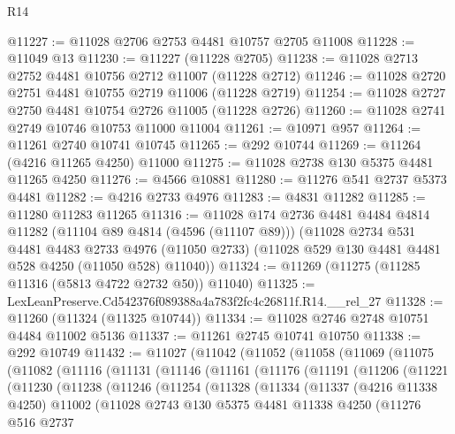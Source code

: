 \begin{lexlean}{R14}
\begin{coremodule}
@11227 := @11028 @2706 @2753 @4481 @10757 @2705 @11008
@11228 := @11049 @13
@11230 := @11227 (@11228 @2705)
@11238 := @11028 @2713 @2752 @4481 @10756 @2712 @11007 (@11228 @2712)
@11246 := @11028 @2720 @2751 @4481 @10755 @2719 @11006 (@11228 @2719)
@11254 := @11028 @2727 @2750 @4481 @10754 @2726 @11005 (@11228 @2726)
@11260 := @11028 @2741 @2749 @10746 @10753 @11000 @11004
@11261 := @10971 @957
@11264 := @11261 @2740 @10741 @10745
@11265 := @292 @10744
@11269 := @11264 (@4216 @11265 @4250) @11000
@11275 := @11028 @2738 @130 @5375 @4481 @11265 @4250
@11276 := @4566 @10881
@11280 := @11276 @541 @2737 @5373 @4481
@11282 := @4216 @2733 @4976
@11283 := @4831 @11282
@11285 := @11280 @11283 @11265
@11316 := @11028
    @174
    @2736
    @4481
    @4484
    @4814
    @11282
    (@11104 @89 @4814 (@4596 (@11107 @89)))
    (@11028
      @2734
      @531
      @4481
      @4483
      @2733
      @4976
      (@11050 @2733)
      (@11028 @529 @130 @4481 @4481 @528 @4250 (@11050 @528) @11040))
@11324 := @11269 (@11275 (@11285 @11316 (@5813 @4722 @2732 @50)) @11040)
@11325 := LexLeanPreserve.Cd542376f089388a4a783f2fc4c26811f.R14.__rel_27
@11328 := @11260 (@11324 (@11325 @10744))
@11334 := @11028 @2746 @2748 @10751 @4484 @11002 @5136
@11337 := @11261 @2745 @10741 @10750
@11338 := @292 @10749
@11432 := @11027
    (@11042
      (@11052
        (@11058
          (@11069
            (@11075
              (@11082
                (@11116
                  (@11131
                    (@11146
                      (@11161
                        (@11176
                          (@11191
                            (@11206
                              (@11221
                                (@11230
                                  (@11238
                                    (@11246
                                      (@11254
                                        (@11328
                                          (@11334
                                            (@11337
                                              (@4216 @11338 @4250)
                                              @11002
                                              (@11028
                                                @2743
                                                @130
                                                @5375
                                                @4481
                                                @11338
                                                @4250
                                                (@11276
                                                  @516
                                                  @2737

\end{coremodule}
\end{lexlean}

